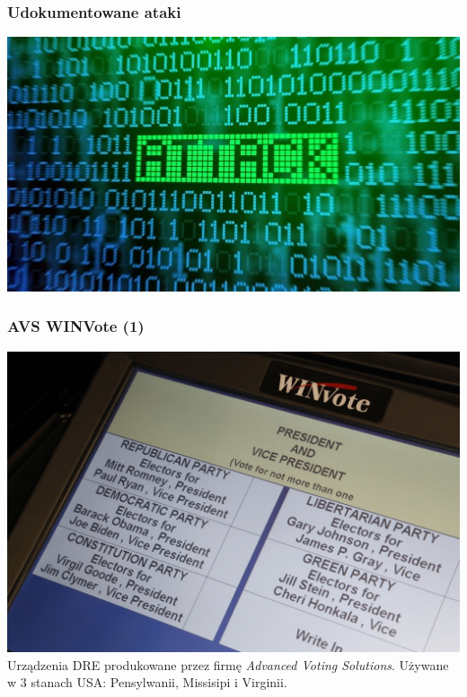 \documentclass{beamer}
\begin{document}
\begin{frame}
\frametitle{Udokumentowane ataki}
\includegraphics[height=0.8\paperheight, center]{attack}
\end{frame}

\begin{frame}
\frametitle{AVS WINVote (1)}
\includegraphics[height=0.7\paperheight, center]{avs-winvote} \\
Urządzenia DRE produkowane przez firmę \textit{Advanced Voting Solutions}. \pause Używane w 3 stanach USA: Pensylwanii, Missisipi i Virginii.
\end{frame}
\end{document}
